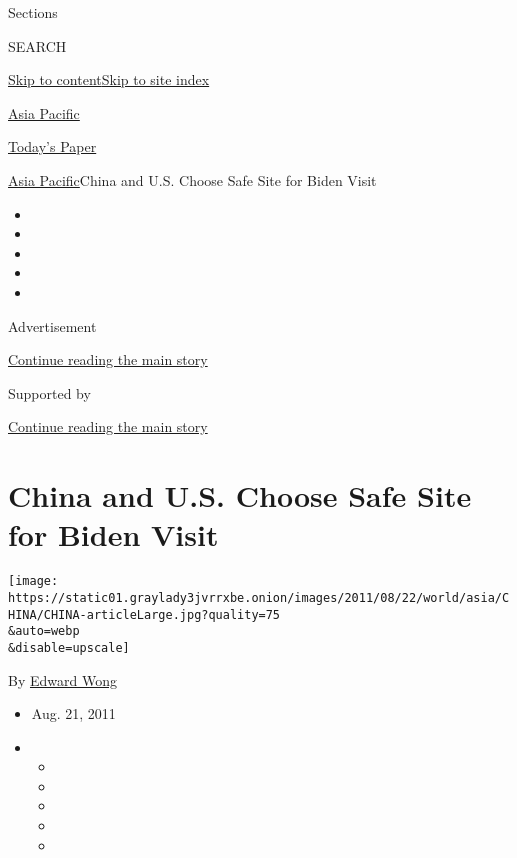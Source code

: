 Sections

SEARCH

\protect\hyperlink{site-content}{Skip to
content}\protect\hyperlink{site-index}{Skip to site index}

\href{https://www.nytimes3xbfgragh.onion/section/world/asia}{Asia
Pacific}

\href{https://myaccount.nytimes3xbfgragh.onion/auth/login?response_type=cookie\&client_id=vi}{}

\href{https://www.nytimes3xbfgragh.onion/section/todayspaper}{Today's
Paper}

\href{/section/world/asia}{Asia Pacific}\textbar{}China and U.S. Choose
Safe Site for Biden Visit

\begin{itemize}
\item
\item
\item
\item
\item
\end{itemize}

Advertisement

\protect\hyperlink{after-top}{Continue reading the main story}

Supported by

\protect\hyperlink{after-sponsor}{Continue reading the main story}

\hypertarget{china-and-us-choose-safe-site-for-biden-visit}{%
\section{China and U.S. Choose Safe Site for Biden
Visit}\label{china-and-us-choose-safe-site-for-biden-visit}}

\texttt{[image: https://static01.graylady3jvrrxbe.onion/images/2011/08/22/world/asia/CHINA/CHINA-articleLarge.jpg?quality=75\\\&auto=webp\\\&disable=upscale]}

By \href{https://www.nytimes3xbfgragh.onion/by/edward-wong}{Edward Wong}

\begin{itemize}
\item
  Aug. 21, 2011
\item
  \begin{itemize}
  \item
  \item
  \item
  \item
  \item
  \end{itemize}
\end{itemize}

